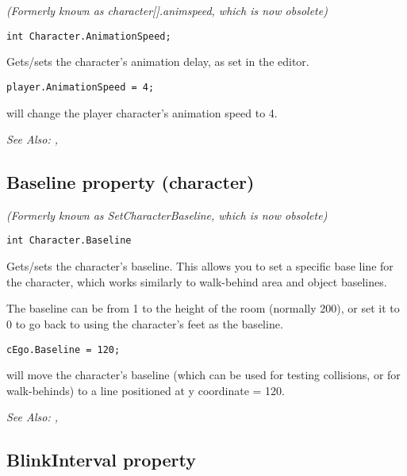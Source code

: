\it{(Formerly known as character[].animspeed, which is now obsolete)}

\begin{verbatim}
int Character.AnimationSpeed;
\end{verbatim}

Gets/sets the character's animation delay, as set in the editor.

\begin{verbatim}
player.AnimationSpeed = 4;
\end{verbatim}
will change the player character's animation speed to 4.

\it{See Also:} ,


\subsection{Baseline property (character)}\label{Character.Baseline}%

\it{(Formerly known as SetCharacterBaseline, which is now obsolete)}

\begin{verbatim}
int Character.Baseline
\end{verbatim}
Gets/sets the character's baseline. This allows you to set a specific
base line for the character, which works similarly to walk-behind area and
object baselines.

The baseline can be from 1 to the height of the room (normally 200), or set it
to 0 to go back to using the character's feet as the baseline.

\begin{verbatim}
cEgo.Baseline = 120;
\end{verbatim}
will move the character's baseline (which can be used for testing collisions,
or for walk-behinds) to a line positioned at y coordinate = 120.

\it{See Also:} , 



\subsection{BlinkInterval property}\label{Character.BlinkInterval}%

